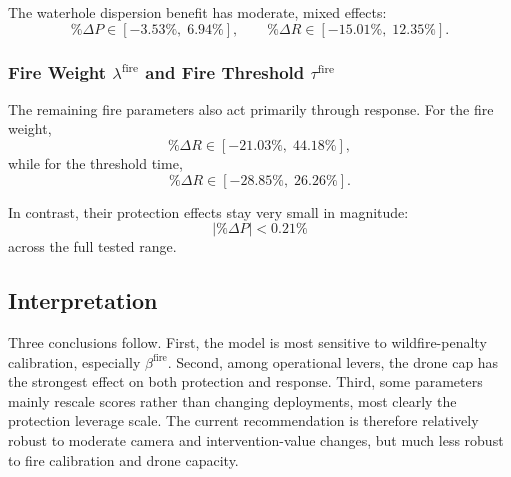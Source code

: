 The waterhole dispersion benefit has moderate, mixed effects:
\[
\%\Delta P \in [-3.53\%,\;6.94\%],
\qquad
\%\Delta R \in [-15.01\%,\;12.35\%].
\]

\subsubsection{Fire Weight \texorpdfstring{$\lambda^{\mathrm{fire}}$}{lambda fire} and Fire Threshold \texorpdfstring{$\tau^{\mathrm{fire}}$}{tau fire}}

The remaining fire parameters also act primarily through response. For the fire weight,
\[
\%\Delta R \in [-21.03\%,\;44.18\%],
\]
while for the threshold time,
\[
\%\Delta R \in [-28.85\%,\;26.26\%].
\]

In contrast, their protection effects stay very small in magnitude:
\[
|\%\Delta P| < 0.21\%
\]
across the full tested range.

\subsection{Interpretation}

Three conclusions follow. First, the model is most sensitive to wildfire-penalty calibration, especially $\beta^{\mathrm{fire}}$. Second, among operational levers, the drone cap has the strongest effect on both protection and response. Third, some parameters mainly rescale scores rather than changing deployments, most clearly the protection leverage scale. The current recommendation is therefore relatively robust to moderate camera and intervention-value changes, but much less robust to fire calibration and drone capacity.
